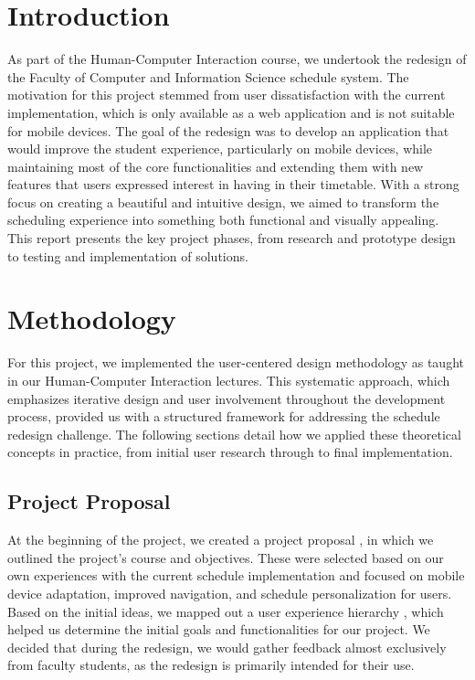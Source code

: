 \documentclass[sigconf,nonacm]{acmart}
\begin{document}
\section{Introduction}
As part of the Human-Computer Interaction course, we undertook the redesign of the Faculty of Computer and Information Science schedule system. The motivation for this project stemmed from user dissatisfaction with the current implementation, which is only available as a web application and is not suitable for mobile devices. The goal of the redesign was to develop an application that would improve the student experience, particularly on mobile devices, while maintaining most of the core functionalities and extending them with new features that users expressed interest in having in their timetable. With a strong focus on creating a beautiful and intuitive design, we aimed to transform the scheduling experience into something both functional and visually appealing. This report presents the key project phases, from research and prototype design to testing and implementation of solutions.

\section{Methodology}
For this project, we implemented the user-centered design methodology as taught in our Human-Computer Interaction lectures. This systematic approach, which emphasizes iterative design and user involvement throughout the development process, provided us with a structured framework for addressing the schedule redesign challenge. The following sections detail how we applied these theoretical concepts in practice, from initial user research through to final implementation.

\subsection{Project Proposal}
At the beginning of the project, we created a project proposal \cite{predlog}, in which we outlined the project's course and objectives. These were selected based on our own experiences with the current schedule implementation and focused on mobile device adaptation, improved navigation, and schedule personalization for users. Based on the initial ideas, we mapped out a user experience hierarchy \cite{hierarhija}, which helped us determine the initial goals and functionalities for our project. We decided that during the redesign, we would gather feedback almost exclusively from faculty students, as the redesign is primarily intended for their use.
\end{document}
